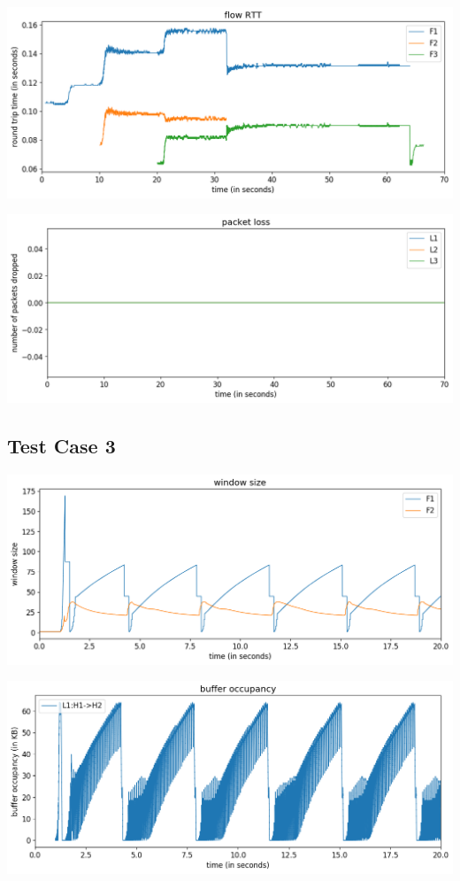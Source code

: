 \documentclass{article}
\begin{document}
\includegraphics[width = \textwidth]{"test_case2_fast flow RTT"}


\includegraphics[width = \textwidth]{"test_case2_fast packet loss"}





\subsection{Test Case 3} 


\includegraphics[width = \textwidth]{"test_case3 window size"}

\includegraphics[width = \textwidth]{"test_case3 buffer occupancy"}
\end{document}
